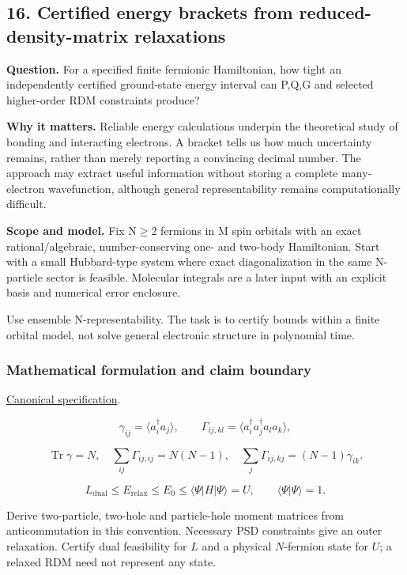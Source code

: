 \documentclass[
  11pt,
]{article}
\begin{document}
\subsection{16. Certified energy brackets from reduced-density-matrix
relaxations}

\textbf{Question.} For a specified finite fermionic Hamiltonian, how
tight an independently certified ground-state energy interval can P,Q,G
and selected higher-order RDM constraints produce?

\textbf{Why it matters.} Reliable energy calculations underpin the
theoretical study of bonding and interacting electrons. A bracket tells
us how much uncertainty remains, rather than merely reporting a
convincing decimal number. The approach may extract useful information
without storing a complete many-electron wavefunction, although general
representability remains computationally difficult.

\textbf{Scope and model.} Fix N\ensuremath{\ge}2 fermions in M spin
orbitals with an exact rational/algebraic, number-conserving one- and
two-body Hamiltonian. Start with a small Hubbard-type system where exact
diagonalization in the same N-particle sector is feasible. Molecular
integrals are a later input with an explicit basis and numerical error
enclosure.

Use ensemble N-representability. The task is to certify bounds within a
finite orbital model, not solve general electronic structure in
polynomial time.

\subsubsection{Mathematical formulation and claim boundary}

\href{https://github.com/rick-stevens-ai/Pure-Thought/blob/main/PRDs/16-N-Representability-2RDM.md}{Canonical
specification}.

\[\gamma_{ij}=\langle a_i^\dagger a_j\rangle,\qquad
\Gamma_{ij,kl}=\langle a_i^\dagger a_j^\dagger a_l a_k\rangle,\]

\[\operatorname{Tr}\gamma=N,\quad
\sum_{ij}\Gamma_{ij,ij}=N(N-1),\quad
\sum_j\Gamma_{ij,kj}=(N-1)\gamma_{ik}.\]

\[L_{\mathrm{dual}}\le E_{\mathrm{relax}}\le E_0\le
\langle\Psi|H|\Psi\rangle=U,\qquad \langle\Psi|\Psi\rangle=1.\]

Derive two-particle, two-hole and particle-hole moment matrices from
anticommutation in this convention. Necessary PSD constraints give an
outer relaxation. Certify dual feasibility for \(L\) and a physical
\(N\)-fermion state for \(U\); a relaxed RDM need not represent any
state.
\end{document}
